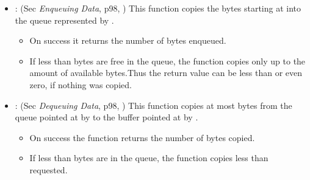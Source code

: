 \begin{itemize}
\item {}: (Sec \emph{Enqueuing Data}, p98, \cite{love2010linux}) This
  function copies the  bytes starting at  into the queue represented
  by .
  \begin{itemize}
  \item On success it returns the number of bytes enqueued.
  \item If less than  bytes are free in the queue, the function copies only up
    to the amount of available bytes.Thus the return value can be less than  or
    even zero, if nothing was copied.
  \end{itemize}
\item {}: (Sec \emph{Dequeuing Data}, p98, \cite{love2010linux}) This
  function copies at most  bytes from the queue pointed at by  to the buffer
  pointed at by .
  \begin{itemize}
  \item  On success the function returns the number of bytes copied.
  \item If less than  bytes are in the queue, the function copies less than requested.
  \end{itemize}
\end{itemize}




